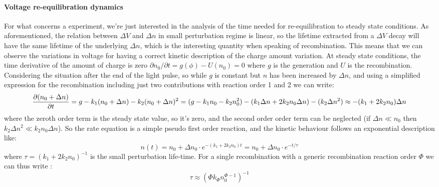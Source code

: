 	\paragraph{Voltage re-equilibration dynamics}
	For what concerns a  experiment, we're just interested in the analysis of the time needed for re-equilibration to steady state conditions.
	As aforementioned, the relation between $\Delta V$ and $\Delta n$ in small perturbation regime is linear, so the lifetime extracted from a $\Delta V$ decay will have the same lifetime of the underlying $\Delta n$, which is the interesting quantity when speaking of recombination.
	This means that we can observe the variations in voltage for having a correct kinetic description of the charge amount variation.
	At steady state conditions, the time derivative of the amount of charge is zero $\partial n_0 / \partial t = g(\phi) - U(n_0) = 0$ where $g$ is the generation and $U$ is the recombination.
	Considering the situation after the end of the light pulse, so while $g$ is constant but $n$ has been increased by $\Delta n$, and using a simplified expression for the recombination including just two contributions with reaction order 1 and 2 we can write:
	\begin{dmath*}
		\pdv{(n_0 + \Delta n)}{t} = g - k_1(n_0 + \Delta n) - k_2(n_0 + \Delta n)^2 = (g - k_1 n_0 - k_2 n_0^2) - (k_1 \Delta n + 2 k_2 n_0 \Delta n) - (k_2 \Delta n ^2) \approx - (k_1 + 2 k_2 n_0 ) \Delta n
	\end{dmath*}
	where the zeroth order term is the steady state value, so it's zero, and the second order order term can be neglected (if $\Delta n \ll n_0$ then $k_2 \Delta n^2 \ll k_2 n_0 \Delta n$).
	So the rate equation is a simple pseudo first order reaction, and the kinetic behaviour follows an exponential description like:
	\begin{equation}\label{eq:tpv_monoexp}
		n (t) = n_0 + \Delta n_0 \cdot e^{-(k_1 + 2 k_2 n_0) t} = n_0 + \Delta n_0 \cdot e^{-t / \tau}
	\end{equation}
	where $\tau = (k_1 + 2 k_2 n_0)^{-1}$ is the small perturbation life-time.
	For a single recombination with a generic recombination reaction order $\Phi$ we can thus write \cite{Shuttle2008}:
	\begin{equation}\label{eq:tpv_tau_order}
		\tau \approx (\Phi k_\Phi n_0^{\Phi-1})^{-1}
	\end{equation}
	
